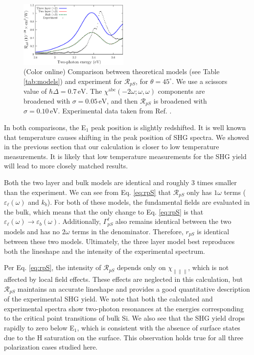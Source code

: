 \begin{figure}[b]
\centering
\includegraphics[width=0.48\textwidth]{figures/03-results/shgyield/fig4}
\caption{(Color online) Comparison between theoretical models (see Table
\ref{tab:models}) and experiment for $\mathcal{R}_{pS}$, for $\theta=45^\circ$.
We use a scissors value of $\hbar\Delta = 0.7\,\text{eV}$. The
$\chi^{\mathrm{abc}}(-2\omega;\omega,\omega)$ components are broadened with
$\sigma=0.05\,\text{eV}$, and then $\mathcal{R}_{pS}$ is broadened with
$\sigma=0.10\,\text{eV}$. Experimental data taken from Ref.
\cite{mitchellSS01}.\label{fig:mitchellRpS}}
\end{figure}

In both comparisons, the E$_{1}$ peak position is slightly redshifted. It is well
known that temperature causes shifting in the peak position of SHG
spectra.\cite{dadapPRB96} We showed in the previous section that our calculation
is closer to low temperature measurements. It is likely that low temperature
measurements for the SHG yield will lead to more closely matched results.

Both the two layer and bulk models are identical and roughly 3 times smaller
than the experiment. We can see from Eq. \eqref{eq:rpS} that $\mathcal{R}_{pS}$
only has $1\omega$ terms ($\varepsilon_{\ell}(\omega)$ and $k_{b}$). For both of
these models, the fundamental fields are evaluated in the bulk, which means that
the only change to Eq. \eqref{eq:rpS} is that $\varepsilon_{\ell}(\omega)
\rightarrow \varepsilon_{b}(\omega)$. Additionally, $\Gamma^{\ell}_{pS}$ also
remains identical between the two models and has no $2\omega$ terms in the
denominator. Therefore, $r_{pS}$ is identical between these two models.
Ultimately, the three layer model best reproduces both the lineshape and the
intensity of the experimental spectrum.

Per Eq. \eqref{eq:rpS}, the intensity of $\mathcal{R}_{pS}$ depends only on
$\chi_{\parallel\parallel\parallel}$, which is not affected by local field
effects.\cite{tancognedejean:tel-01235611} These effects are neglected in this
calculation, but $\mathcal{R}_{pS}$ maintains an accurate lineshape and provides
a good quantitative description of the experimental SHG yield. We note that both
the calculated and experimental spectra show two-photon resonances at the
energies corresponding to the critical point transitions of bulk Si. We also see
that the SHG yield drops rapidly to zero below E$_{1}$, which is consistent with
the absence of surface states due to the H saturation on the surface. This
observation holds true for all three polarization cases studied here.

